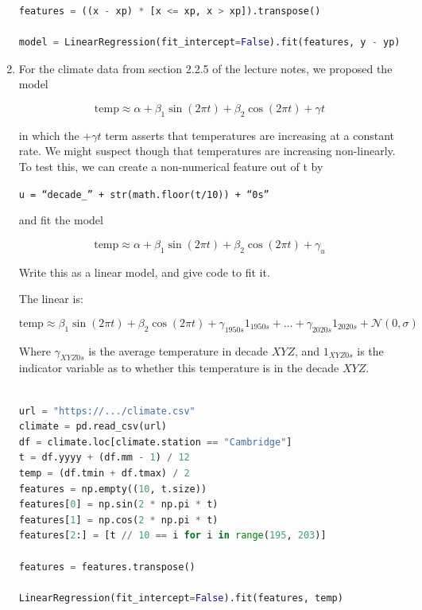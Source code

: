 \documentclass[10pt,\jkfside,a4paper]{article}
\begin{document}
\begin{enumerate}
\begin{lstlisting}[language=Python]
features = ((x - xp) * [x <= xp, x > xp]).transpose()

model = LinearRegression(fit_intercept=False).fit(features, y - yp)

\end{lstlisting}

\item For the climate data from section 2.2.5 of the lecture notes, we
proposed the model

\[
\text{temp} \approx \alpha + \beta_1\sin(2\pi t) + \beta_2\cos(2\pi t) +
\gamma t
\]

in which the $+\gamma t$ term asserts that temperatures are increasing at a
constant rate. We might suspect though that temperatures are increasing
non-linearly. To test this, we can create a non-numerical feature out of t by

\begin{center}
\texttt{u = ``decade\_'' + str(math.floor(t/10)) + ``0s''}
\end{center}

and fit the model

\[
\text{temp} \approx \alpha + \beta_1\sin(2\pi t) + \beta_2\cos(2\pi t) +
\gamma_u
\]

Write this as a linear model, and give code to fit it.

The linear is:

\[
\text{temp} \approx \beta_1\sin(2\pi t) + \beta_2\cos(2\pi t) +
\gamma_{1950s}1_{1950s} + \dots + \gamma_{2020s}1_{2020s} + \mathcal{N}(0, \sigma)
\]

Where $\gamma_{XYZ0s}$ is the average temperature in decade $XYZ$, and
$1_{XYZ0s}$ is the indicator variable as to whether this temperature is in
the decade $XYZ$.


\begin{lstlisting}[language=Python]

url = "https://.../climate.csv"
climate = pd.read_csv(url)
df = climate.loc[climate.station == "Cambridge"]
t = df.yyyy + (df.mm - 1) / 12
temp = (df.tmin + df.tmax) / 2
features = np.empty((10, t.size))
features[0] = np.sin(2 * np.pi * t)
features[1] = np.cos(2 * np.pi * t)
features[2:] = [t // 10 == i for i in range(195, 203)]

features = features.transpose()

LinearRegression(fit_intercept=False).fit(features, temp)

\end{lstlisting}


\end{enumerate}
\end{document}
